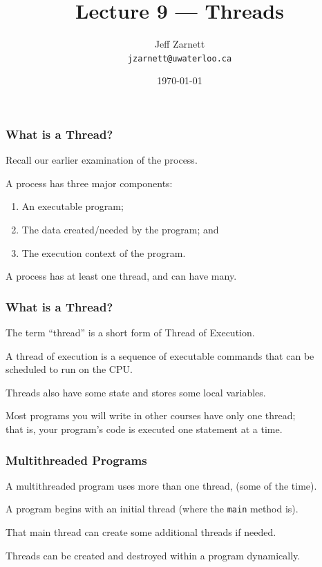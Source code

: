 

\title{Lecture 9 --- Threads}

\author{Jeff Zarnett \\ \small \texttt{jzarnett@uwaterloo.ca}}
\date{\today}




\begin{frame}
  \titlepage

 \end{frame}

\begin{frame}
\frametitle{What is a Thread?}


Recall our earlier examination of the process. 

A process has three major components: 
\begin{enumerate}
\item An executable program;
\item The data created/needed by the program; and 
\item The execution context of the program.
\end{enumerate}

A process has at least one \alert{thread}, and can have many.

\end{frame}

\begin{frame}
\frametitle{What is a Thread?}

The term ``thread'' is a short form of \alert{Thread of Execution}.

  A thread of execution is a sequence of executable commands that can be scheduled to run on the CPU. 
  
  Threads also have some state and stores some local variables.
  
  Most programs you will write in other courses have only one thread;\\
  \quad that is, your program's code is executed one statement at a time.

\end{frame}

\begin{frame}
\frametitle{Multithreaded Programs}

A multithreaded program uses more than one thread, (some of the time).

  A program begins with an initial thread (where the \texttt{main} method is).
  
That main thread can create some additional threads if needed.

 Threads can be created and destroyed within a program dynamically.

\end{frame}

